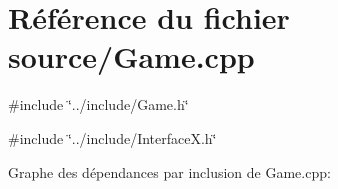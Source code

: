 \hypertarget{a00040}{
\section{Référence du fichier source/Game.cpp}
\label{a00040}
}
{\ttfamily \#include \char`\"{}../include/Game.h\char`\"{}}\par
{\ttfamily \#include \char`\"{}../include/InterfaceX.h\char`\"{}}\par
Graphe des dépendances par inclusion de Game.cpp:

